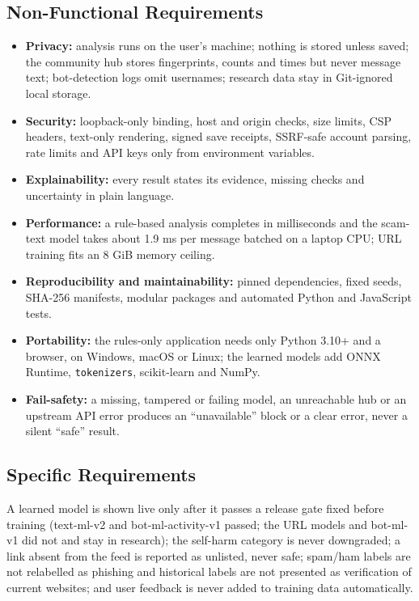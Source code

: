 \subsection{Non-Functional Requirements}
\begin{itemize}
\item \textbf{Privacy:} analysis runs on the user's machine; nothing is stored unless saved; the community hub stores fingerprints, counts and times but never message text; bot-detection logs omit usernames; research data stay in Git-ignored local storage.
\item \textbf{Security:} loopback-only binding, host and origin checks, size limits, CSP headers, text-only rendering, signed save receipts, SSRF-safe account parsing, rate limits and API keys only from environment variables.
\item \textbf{Explainability:} every result states its evidence, missing checks and uncertainty in plain language.
\item \textbf{Performance:} a rule-based analysis completes in milliseconds and the scam-text model takes about 1.9 ms per message batched on a laptop CPU; URL training fits an 8 GiB memory ceiling.
\item \textbf{Reproducibility and maintainability:} pinned dependencies, fixed seeds, SHA-256 manifests, modular packages and automated Python and JavaScript tests.
\item \textbf{Portability:} the rules-only application needs only Python 3.10+ and a browser, on Windows, macOS or Linux; the learned models add ONNX Runtime, \texttt{tokenizers}, scikit-learn and NumPy.
\item \textbf{Fail-safety:} a missing, tampered or failing model, an unreachable hub or an upstream API error produces an ``unavailable'' block or a clear error, never a silent ``safe'' result.
\end{itemize}

\subsection{Specific Requirements}
\noindent A learned model is shown live only after it passes a release gate fixed before training (text-ml-v2 and bot-ml-activity-v1 passed; the URL models and bot-ml-v1 did not and stay in research); the self-harm category is never downgraded; a link absent from the feed is reported as unlisted, never safe; spam/ham labels are not relabelled as phishing and historical labels are not presented as verification of current websites; and user feedback is never added to training data automatically.

